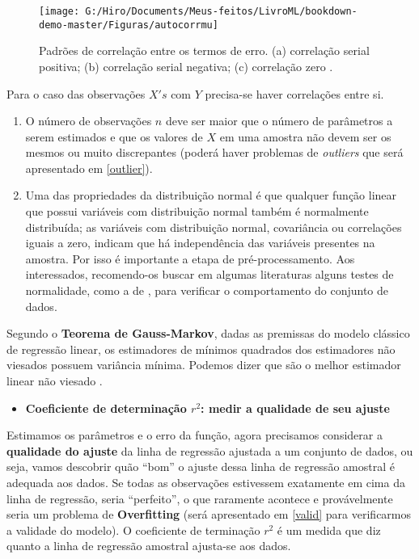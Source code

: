 \documentclass[
  openany]{book}
\providecommand{\tightlist}{%
  \setlength{\itemsep}{0pt}\setlength{\parskip}{0pt}}
\begin{document}
\begin{figure}

{\centering \texttt{[image: G:/Hiro/Documents/Meus-feitos/LivroML/bookdown-demo-master/Figuras/autocorrmu]} 

}

\caption{Padrões de correlação entre os termos de erro. (a) correlação serial positiva; (b) correlação serial negativa; (c) correlação zero \citep{gujarati2011econometria}.}\label{fig:autocorrmu}
\end{figure}



Para o caso das observações \(X's\) com \(Y\) precisa-se haver correlações entre si.

\begin{enumerate}
\def\labelenumi{\arabic{enumi}.}
\setcounter{enumi}{4}
\item
  O número de observações \(n\) deve ser maior que o número de parâmetros a serem estimados e que os valores de \(X\) em uma amostra não devem ser os mesmos ou muito discrepantes (poderá haver problemas de \emph{outliers} que será apresentado em \ref{outlier}).
\item
  Uma das propriedades da distribuição normal é que qualquer função linear que possui variáveis com distribuição normal também é normalmente distribuída; as variáveis com distribuição normal, covariância ou correlações iguais a zero, indicam que há independência das variáveis presentes na amostra. Por isso é importante a etapa de pré-processamento. Aos interessados, recomendo-os buscar em algumas literaturas alguns testes de normalidade, como a de \citep{shapiro1965analysis}, para verificar o comportamento do conjunto de dados.
\end{enumerate}

Segundo o \textbf{Teorema de Gauss-Markov}, dadas as premissas do modelo clássico de regressão linear, os estimadores de mínimos quadrados dos estimadores não viesados possuem variância mínima. Podemos dizer que são o melhor estimador linear não viesado \citep{gujarati2011econometria}.

\begin{itemize}
\tightlist
\item
  \textbf{Coeficiente de determinação \(r^2\): medir a qualidade de seu ajuste}
\end{itemize}

Estimamos os parâmetros e o erro da função, agora precisamos considerar a \textbf{qualidade do ajuste} da linha de regressão ajustada a um conjunto de dados, ou seja, vamos descobrir quão ``bom'' o ajuste dessa linha de regressão
amostral é adequada aos dados. Se todas as observações estivessem exatamente em cima da linha de regressão, seria ``perfeito'', o que raramente acontece e provávelmente seria um problema de \textbf{Overfitting} (será apresentado em \ref{valid} para verificarmos a validade do modelo). O coeficiente de terminação \(r^2\) é um medida que diz quanto a linha de regressão
amostral ajusta-se aos dados.
\end{document}
